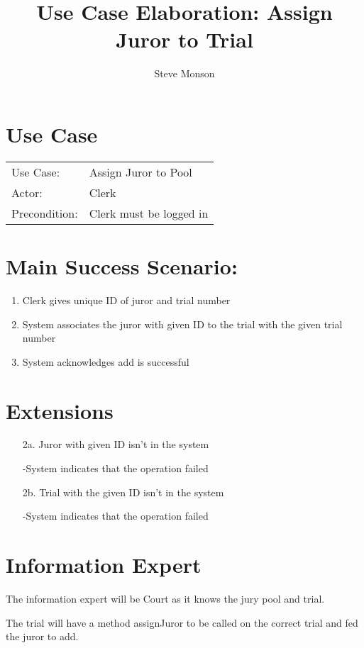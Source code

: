 \documentclass{article}
\title{Use Case Elaboration: Assign Juror to Trial}
\author{Steve Monson}
\begin{document}
\maketitle

\section*{Use Case}
\begin{tabular}{l l}
  Use Case:     & Assign Juror to Pool\\
  Actor:        & Clerk\\
  Precondition: & Clerk must be logged in\\
\end{tabular}

\section*{Main Success Scenario:}
\begin{enumerate}
  \item Clerk gives unique ID of juror and trial number
  \item System associates the juror with given ID to the trial with the given trial number
  \item System acknowledges add is successful
\end{enumerate}

\section*{Extensions}
\begin{itemize}
  \item [2a.] Juror with given ID isn't in the system
  
    -System indicates that the operation failed
  
  \item [2b.] Trial with the given ID isn't in the system

    -System indicates that the operation failed

\end{itemize}

\section*{Information Expert}

The information expert will be Court as it knows the jury pool and trial.

The trial will have a method assignJuror to be called on the correct trial and fed the juror to add. 
\end{document}
